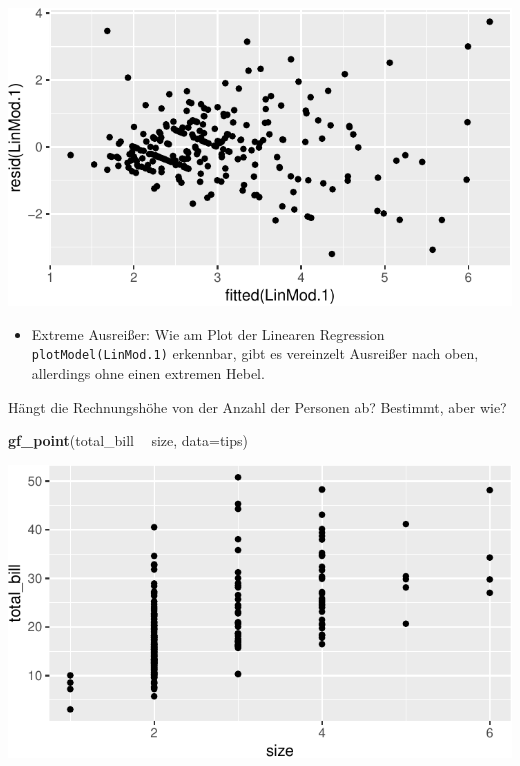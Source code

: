 \documentclass[12pt,ngerman,paper=a4,pagesize,DIV=13]{scrreprt}
\newenvironment{Shaded}{\begin{snugshade}}{\end{snugshade}}
\newcommand{\DataTypeTok}[1]{\textcolor[rgb]{0.13,0.29,0.53}{#1}}
\newcommand{\KeywordTok}[1]{\textcolor[rgb]{0.13,0.29,0.53}{\textbf{#1}}}
\newcommand{\NormalTok}[1]{#1}
\newcommand{\OperatorTok}[1]{\textcolor[rgb]{0.81,0.36,0.00}{\textbf{#1}}}
\newcommand{\StringTok}[1]{\textcolor[rgb]{0.31,0.60,0.02}{#1}}
\providecommand{\tightlist}{%
  \setlength{\itemsep}{0pt}\setlength{\parskip}{0pt}}
\begin{document}
\includegraphics{DatenerhebungStatistik-Uebung_files/figure-latex/unnamed-chunk-166-1.pdf}

\begin{itemize}
\tightlist
\item
  Extreme Ausreißer: Wie am Plot der Linearen Regression
  \texttt{plotModel(LinMod.1)} erkennbar, gibt es vereinzelt Ausreißer
  nach oben, allerdings ohne einen extremen Hebel.
\end{itemize}

Hängt die Rechnungshöhe von der Anzahl der Personen ab? Bestimmt, aber
wie?

\begin{Shaded}
\begin{Highlighting}[]
\KeywordTok{gf_point}\NormalTok{(total_bill }\OperatorTok{~}\StringTok{ }\NormalTok{size, }\DataTypeTok{data=}\NormalTok{tips)}
\end{Highlighting}
\end{Shaded}

\includegraphics{DatenerhebungStatistik-Uebung_files/figure-latex/unnamed-chunk-167-1.pdf}
\end{document}
